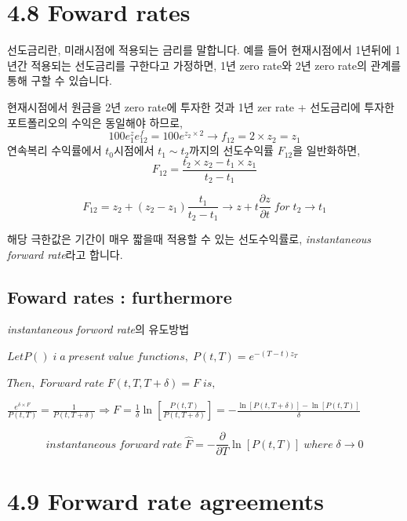 \documentclass[
  letterpaper,
  DIV=11,
  numbers=noendperiod]{scrreprt}
\begin{document}
\section*{4.8 Foward rates}\label{foward-rates}


선도금리란, 미래시점에 적용되는 금리를 말합니다. 예를 들어 현재시점에서
1년뒤에 1년간 적용되는 선도금리를 구한다고 가정하면, 1년 zero rate와 2년
zero rate의 관계를 통해 구할 수 있습니다.

현재시점에서 원금을 2년 zero rate에 투자한 것과 1년 zer rate +
선도금리에 투자한 포트폴리오의 수익은 동일해야 하므로,
\[100e^z_1e^f_{12}=100e^{z_2\times 2}\rightarrow f_{12}=2\times z_2=z_1\]
연속복리 수익률에서 \(t_0\)시점에서 \(t_1\sim t_2\)까지의 선도수익률
\(F_{12}\)을 일반화하면,
\[F_{12}=\frac{t_2\times z_2-t_1\times z_1}{t_2-t_1}\]

\[F_{12}=z_2+(z_2-z_1)\frac{t_1}{t_2-t_1}\rightarrow z+t\frac{\partial z}{\partial t}\;for\; t_2\rightarrow t_1\]

해당 극한값은 기간이 매우 짧을때 적용할 수 있는 선도수익률로,
\emph{instantaneous forward rate}라고 합니다.

\subsection*{Foward rates : furthermore}\label{foward-rates-furthermore}

\emph{instantaneous forword rate}의 유도방법

\(Let P()\; i\;  a\; present\; value\; functions,\; P(t,T)=e^{-(T-t)z_T}\)

\(Then,\; Forward\; rate\; F(t,T,T+\delta)=F\; is,\)

\(\frac{e^{\delta\times F}}{P(t,T)}=\frac{1}{P(t,T+\delta)}\Rightarrow F=\frac{1}{\delta}\ln[\frac{P(t,T)}{P(t,T+\delta)}]=-\frac{\ln[P(t,T+\delta)]-\ln[P(t,T)]}{\delta}\)

\[instantaneous\; forward\; rate\; \hat{F}=-\frac{\partial}{\partial T}\ln[P(t,T)]\; where\;\delta \rightarrow 0\]

\section*{4.9 Forward rate agreements}\label{forward-rate-agreements}
\end{document}
